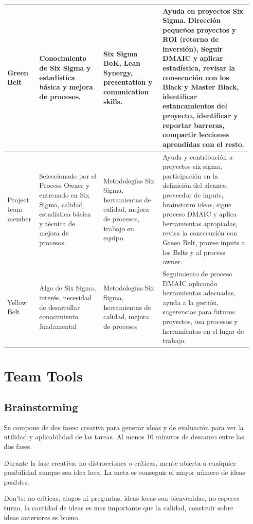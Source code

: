 \documentclass[oneside]{book}
\begin{document}
\begin{tabular}{p{1.5cm}|p{3cm}|p{4cm}|p{7cm}}
	\hline Green Belt& Conocimiento de Six Sigma y estadística básica y mejora de procesos. & Six Sigma BoK, Lean Synergy, presentation y comunication skills. & Ayuda en proyectos Six Sigma. Dirección pequeños proyectos y ROI (retorno de inversión), Seguir DMAIC y aplicar estadística, revisar la consecución con los Black y Master Black, identificar estancamientos del proyecto, identificar y reportar barreras, compartir lecciones aprendidas con el resto. \\
	\hline Project team member & Seleccionado por el Process Owner y entrenado en Six Sigma, calidad, estadística básica y técnica de mejora de procesos. & Metodologías Six Sigma, herramientas de calidad, mejora de procesos, trabajo en equipo. & Ayuda y contribución a proyectos six sigma, participación en la definición del alcance, proveedor de inputs, brainstorm ideas, sigue proceso DMAIC y aplica herramientas apropiadas, revisa la consecución con Green Belt, provee inputs a los Belts y al process owner. \\
	\hline Yellow Belt & Algo de Six Sigma, interés, necesidad de desarrollar conocimiento fundamental & Metodologías Six Sigma, herramientas de calidad, mejora de procesos & Seguimiento de proceso DMAIC aplicando herramientas adecuadas, ayuda a la gestión, sugerencias para futuros proyectos, usa procesos y herramientas en el lugar de trabajo. \\
	\hline 
\end{tabular} 

\section{Team Tools}

\subsection{Brainstorming}
Se compone de dos fases: creativa para generar ideas y de evaluación para ver la utilidad y aplicabilidad de las tareas. Al menos 10 minutos de descanso entre las dos fases.

Durante la fase creativa: no distracciones o críticas, mente abierta a cualquier posibilidad aunque sea idea loca. La meta es conseguir el mayor número de ideas posibles.

Don'ts: no criticas, alagos ni preguntas, ideas locas son bienvenidas, no esperes turno, la cantidad de ideas es mas importante que la calidad, construir sobre ideas anteriores es bueno.
\end{document}
